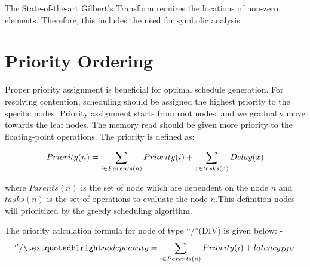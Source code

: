 The State-of-the-art Gilbert's Transform requires the locations of non-zero elements. Therefore, this includes the need for symbolic analysis. 

%
%

\section{Priority Ordering}

Proper priority assignment is beneficial for optimal schedule generation. For resolving contention, scheduling should be assigned the highest priority to the specific nodes. Priority assignment starts from root nodes, and we gradually move towards the leaf nodes. The memory read should be given more priority to the floating-point operations. The priority is defined as:
\begin{tcolorbox}
\begin{equation*}
    \centering
    Priority(n) = \sum_{i \in Parents(n)} Priority(i) + \sum_{x \in tasks(n)} Delay(x)
\end{equation*}
\end{tcolorbox}

where $Parents(n)$ is the set of node which are dependent on the node $n$ and $tasks(n)$ is the set of operations to evaluate the node $n$.This definition nodes will prioritized by the greedy scheduling  algorithm.

The priority calculation formula for node of type “/”(DIV) is given below: -
\begin{equation*}
    \centering
    ''/” node priority = \sum_{i \in Parents(n)} Priority(i) + latency_{DIV}
\end{equation*}


